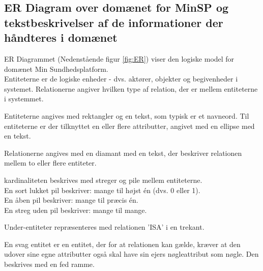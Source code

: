 \subsection*{ER Diagram over domænet for MinSP og tekstbeskrivelser af de informationer der håndteres i domænet}
ER Diagrammet (Nedenstående figur \ref{fig:ER}) viser den logiske model for domænet Min Sundhedsplatform. \\
Entiteterne er de logiske enheder - dvs. aktører, objekter og begivenheder i systemet. 
Relationerne angiver hvilken type af relation, der er mellem entiteterne i systemmet.

Entiteterne angives med rektangler og en tekst, som typisk er et navneord. Til entiteterne er der tilknyttet en eller flere attributter, angivet med en ellipse med en tekst.

Relationerne angives med en diamant med en tekst, der beskriver relationen mellem to eller flere entiteter.

kardinaliteten beskrives med streger og pile mellem entiteterne. \\ 
En sort lukket pil beskriver: mange til højst én (dvs. 0 eller 1).\\
En åben pil beskriver: mange til præcis én.\\
En streg uden pil beskriver: mange til mange.

Under-entiteter repræsenteres med relationen 'ISA' i en trekant.

En svag entitet er en entitet, der for at relationen kan gælde, kræver at den udover sine egne attributter også skal have sin ejers nøgleattribut som nøgle. Den beskrives med en fed ramme.

